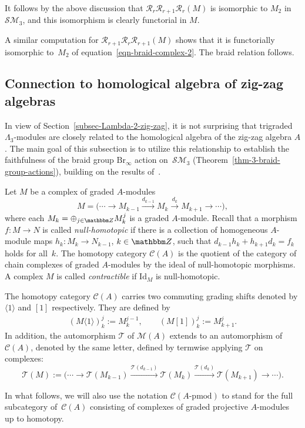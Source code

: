 \documentclass[10pt,a4paper]{amsart}
\theoremstyle{definition}
\numberwithin{equation}{section}
\def\Z{{\mathbbm Z}}
\def\lra{{\longrightarrow}}
\def\pmod{{\mathrm{\mbox{-}pmod}}} %
\def\mc{\mathcal}
\begin{document}
It follows by the above discussion that $\mc{R}_r\mc{R}_{r+1}\mc{R}_r(M)$ is isomorphic to $M_2$ in $\mc{SM}_3$, and this isomorphism is clearly functorial in $M$.

A similar computation for $\mc{R}_{r+1}\mc{R}_{r}\mc{R}_{r+1}(M)$ shows that it is functorially isomorphic to~$M_2$ of equation~\eqref{eqn-braid-complex-2}. The braid relation follows.

\subsection{Connection to homological algebra of zig-zag algebras}
In view of Section~\ref{subsec-Lambda-2-zig-zag}, it is not surprising that trigraded $\Lambda_3$-modules are closely related to the homological algebra of the zig-zag algebra $A$. The main goal of this subsection is to utilize this relationship to establish the faithfulness of the braid group $\mathrm{Br}_\infty$ action on~$\mc{SM}_3$ (Theorem~\ref{thm-3-braid-group-actions}), building on the results of~\cite{KhSe}.

Let $M$ be a complex of graded $A$-modules
\[
M=\Big(
\cdots \lra M_{k-1} \stackrel{d_{k-1}}{\lra} M_k \stackrel{d_k}{\lra} M_{k+1} \lra \cdots
\Big),
\]
where each $M_k=\oplus_{j\in \Z}M_{k}^j$ is a graded $A$-module.
Recall that a morphism $f\colon M\lra N$ is called \emph{null-homotopic} if there is a collection of homogeneous $A$-module maps $h_k\colon M_{k}\lra N_{k-1}$, $k\in \Z$, such that $d_{k-1}h_{k}+h_{k+1}d_k=f_k$ holds for all~$k$. The homotopy category $\mc{C}(A)$ is the quotient of the category of chain complexes of graded $A$-modules by the ideal of null-homotopic morphisms. A complex $M$ is called \emph{contractible} if $\mathrm{Id}_M$ is null-homotopic.

The homotopy category $\mc{C}(A)$ carries two commuting grading shifts denoted by $\langle 1 \rangle$ and $[1]$ respectively. They are defined by
\begin{gather*}
 ( M\langle 1 \rangle )^j_k:=M^{j-1}_k,\qquad (M[1] )^j_k:=M^{j}_{k+1}.
\end{gather*}
In addition, the automorphism $\mc{T}$ of $\mc{M}(A)$ extends to an automorphism of $\mc{C}(A)$, denoted by the same letter, defined by termwise applying $\mc{T}$ on complexes:
\[
\mc{T}(M):=\Big(
\cdots \lra \mc{T}(M_{k-1}) \xrightarrow{\mc{T}(d_{k-1})} \mc{T}(M_k) \xrightarrow{\mc{T}(d_k)} \mc{T}(M_{k+1}) \lra \cdots
\Big).
\]

In what follows, we will also use the notation $\mc{C}(A\pmod)$ to stand for the full subcategory of~$\mc{C}(A)$ consisting of complexes of graded projective $A$-modules up to homotopy.
\end{document}
